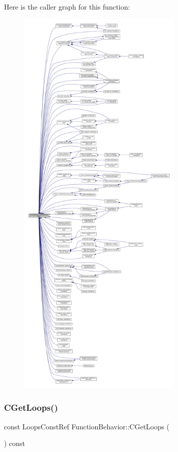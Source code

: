 Here is the caller graph for this function\+:
\nopagebreak
\begin{figure}[H]
\begin{center}
\leavevmode
\includegraphics[height=550pt]{d9/d45/classFunctionBehavior_a084fd6d48df94ccce7451871ebf1e2ab_icgraph}
\end{center}
\end{figure}
\mbox{\label{classFunctionBehavior_ae532eee749635388e7e4b0a460ec5778}} 
\subsubsection{\texorpdfstring{C\+Get\+Loops()}{CGetLoops()}}
{\footnotesize\ttfamily const Loops\+Const\+Ref Function\+Behavior\+::\+C\+Get\+Loops (\begin{DoxyParamCaption}{ }\end{DoxyParamCaption}) const}



